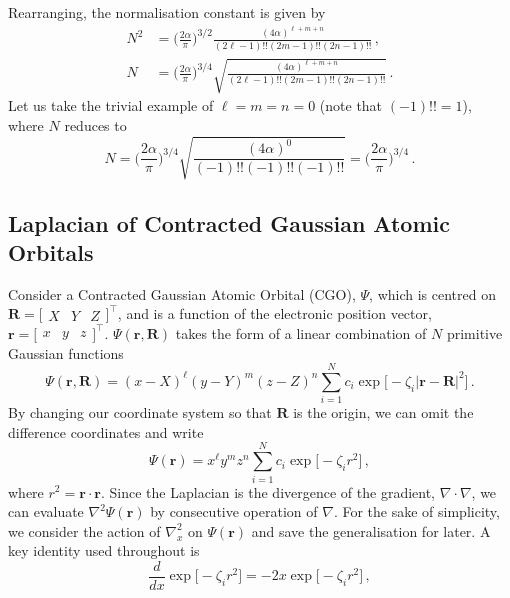 %
Rearranging, the normalisation constant is given by
%
\begin{align}
	N^2 &= \Bigg( \frac{2\alpha}{\pi} \Bigg)^{3/2} \frac{(4\alpha)^{\ell + m + n}}{(2\ell - 1)!!(2m - 1)!!(2n - 1)!!} \nonumber \,, \\
    N &= \Bigg( \frac{2\alpha}{\pi} \Bigg)^{3/4} \sqrt{\frac{(4\alpha)^{\ell + m + n}}{(2\ell - 1)!!(2m - 1)!!(2n - 1)!!}}\,.
\end{align}
%
Let us take the trivial example of $\ell = m = n = 0$ (note that $(-1)!! = 1$), where $N$ 
reduces to 
%
\begin{equation}
	N = \Bigg( \frac{2\alpha}{\pi} \Bigg)^{3/4} \sqrt{\frac{(4\alpha)^0}{(-1)!!(-1)!!(-1)!!}} = \Bigg( \frac{2\alpha}{\pi} \Bigg)^{3/4}\,.
\end{equation}


\subsection{Laplacian of Contracted Gaussian Atomic Orbitals}
%
Consider a Contracted Gaussian Atomic Orbital (CGO), $\Psi$, which is centred on 
$\mathbf{R} = \big[ \begin{array}{ccc} X & Y & Z \end{array}\big]^\top$, and is a function of 
the electronic position vector, $\mathbf{r} = \big[ \begin{array}{ccc} x & y & z \end{array}\big]^\top$. 
$\Psi(\mathbf{r}, \mathbf{R})$ takes the form of a linear combination of $N$ primitive Gaussian functions
%
\begin{equation}
	\Psi(\mathbf{r,R}) = (x - X)^\ell (y - Y)^m (z - Z)^n \sum_{i=1}^N c_i \exp \Big[ -\zeta_i |\mathbf{r-R}|^2 \Big] \,.
\end{equation}
%
By changing our coordinate system so that $\mathbf{R}$ is the origin, we can omit the difference 
coordinates and write
%
\begin{equation}
	\Psi(\mathbf{r}) = x^\ell y^m z^n \sum_{i=1}^N c_i \exp \Big[ -\zeta_i r^2 \Big] \,,
\end{equation}
%
where $r^2 = \mathbf{r}\cdot \mathbf{r}$. Since the Laplacian is the divergence of the gradient, 
$\nabla \cdot \nabla$, we can evaluate $\nabla^2 \Psi(\mathbf{r})$ by consecutive operation of $\nabla$. 
For the sake of simplicity, we consider the action of $\nabla_x^2$ on $\Psi(\mathbf{r})$ and save the 
generalisation for later. A key identity used throughout is
%
\begin{displaymath}
	\frac{d}{dx} \exp\Big[ -\zeta_i r^2 \Big] = -2x \exp\Big[ -\zeta_i r^2 \Big] \,,
\end{displaymath}
